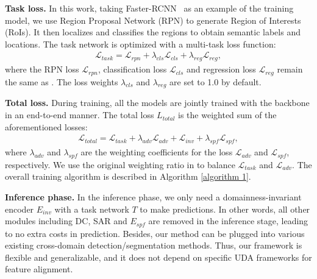 \documentclass[10pt,journal,compsoc]{IEEEtran}
\begin{document}
\noindent \textbf{Task loss.} In this work, taking Faster-RCNN~\cite{ren2015faster} as an example of the training model, we use Region Proposal Network (RPN) to generate Region of Interests (RoIs). It then localizes and classifies the regions to obtain semantic labels and locations. The task network is optimized with a multi-task loss function:
\begin{align}
\label{eq:task}
  \mathcal{L}_{task} = \mathcal{L}_{rpn} + \lambda_{cls} \mathcal{L}_{cls} + \lambda_{reg} \mathcal{L}_{reg} ,
\end{align}
where the RPN loss $\mathcal{L}_{rpn}$, classification loss $\mathcal{L}_{cls}$ and regression loss $\mathcal{L}_{reg}$ remain the same as \cite{ren2015faster}. The
loss weights $\lambda_{cls}$ and $\lambda_{reg}$ are set to 1.0 by default.

\noindent \textbf{Total loss.} During training, all the models are jointly trained with the backbone in an end-to-end manner. The total loss $L_{total}$ is the weighted sum
of the aforementioned losses:
\begin{align}
\label{eq:total}
  \mathcal{L}_{total} = \mathcal{L}_{task} + \lambda_{adv} \mathcal{L}_{adv} +\mathcal{L}_{inv} + \lambda_{spf} \mathcal{L}_{spf},
\end{align}
where $\lambda_{adv}$ and $\lambda_{spf}$ are the weighting coefficients for the loss $\mathcal{L}_{adv}$ and $\mathcal{L}_{spf}$, respectively. We use the original weighting ratio in \cite{DA-Faster-RCNN,SWDA,SCL,GPA,AdaptSegNet,CLAN,SIM} to balance $\mathcal{L}_{task}$ and $\mathcal{L}_{adv}$.  The overall training algorithm is described in Algorithm \ref{algorithm 1}.

\noindent \textbf{Inference phase.} In the inference phase, we only need a domainness-invariant encoder $E_{inv}$ with a task network $T$ to make predictions. In other words, all other modules including DC, SAR and $E_{spf}$ are removed in the inference stage, leading to no extra costs in prediction.  Besides, our method can be plugged into various existing cross-domain detection/segmentation methods.  Thus, our framework is flexible and generalizable, and it does not depend on specific UDA frameworks for feature alignment.
\end{document}
